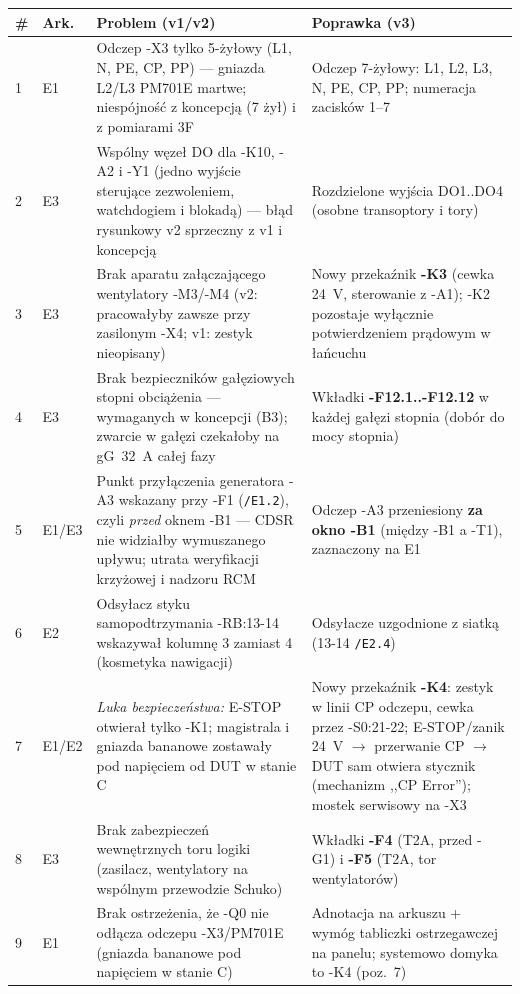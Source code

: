 \documentclass[11pt,a4paper]{article}
\begin{document}
\begin{longtable}{@{}p{}p{}p{}p{}@{}}
\toprule
\textbf{\#} & \textbf{Ark.} & \textbf{Problem (v1/v2)} & \textbf{Poprawka (v3)}\\
\midrule
\endhead
1 & E1 & Odczep -X3 tylko 5-żyłowy (L1, N, PE, CP, PP) --- gniazda L2/L3 PM701E martwe;
niespójność z koncepcją (7 żył) i z pomiarami 3F & Odczep 7-żyłowy: L1, L2, L3, N, PE, CP, PP;
numeracja zacisków 1--7\\
2 & E3 & Wspólny węzeł DO dla -K10, -A2 i -Y1 (jedno wyjście sterujące zezwoleniem, watchdogiem
i blokadą) --- błąd rysunkowy v2 sprzeczny z v1 i koncepcją & Rozdzielone wyjścia DO1..DO4
(osobne transoptory i tory)\\
3 & E3 & Brak aparatu załączającego wentylatory -M3/-M4 (v2: pracowałyby zawsze przy zasilonym
-X4; v1: zestyk nieopisany) & Nowy przekaźnik \textbf{-K3} (cewka 24~V, sterowanie z -A1);
-K2 pozostaje wyłącznie potwierdzeniem prądowym w łańcuchu\\
4 & E3 & Brak bezpieczników gałęziowych stopni obciążenia --- wymaganych w koncepcji (B3);
zwarcie w gałęzi czekałoby na gG~32~A całej fazy & Wkładki \textbf{-F12.1..-F12.12} w każdej
gałęzi stopnia (dobór do mocy stopnia)\\
5 & E1/E3 & Punkt przyłączenia generatora -A3 wskazany przy -F1 (\texttt{/E1.2}), czyli
\emph{przed} oknem -B1 --- CDSR nie widziałby wymuszanego upływu; utrata weryfikacji krzyżowej
i nadzoru RCM & Odczep -A3 przeniesiony \textbf{za okno -B1} (między -B1 a -T1), zaznaczony
na E1\\
6 & E2 & Odsyłacz styku samopodtrzymania -RB:13-14 wskazywał kolumnę 3 zamiast 4 (kosmetyka
nawigacji) & Odsyłacze uzgodnione z siatką (13-14 \texttt{/E2.4})\\
7 & E1/E2 & \emph{Luka bezpieczeństwa:} E-STOP otwierał tylko -K1; magistrala i gniazda bananowe
zostawały pod napięciem od DUT w stanie C & Nowy przekaźnik \textbf{-K4}: zestyk w linii CP
odczepu, cewka przez -S0:21-22; E-STOP/zanik 24~V $\to$ przerwanie CP $\to$ DUT sam otwiera
stycznik (mechanizm ,,CP Error''); mostek serwisowy na -X3\\
8 & E3 & Brak zabezpieczeń wewnętrznych toru logiki (zasilacz, wentylatory na wspólnym
przewodzie Schuko) & Wkładki \textbf{-F4} (T2A, przed -G1) i \textbf{-F5} (T2A, tor
wentylatorów)\\
9 & E1 & Brak ostrzeżenia, że -Q0 nie odłącza odczepu -X3/PM701E (gniazda bananowe pod napięciem
w stanie C) & Adnotacja na arkuszu + wymóg tabliczki ostrzegawczej na panelu; systemowo
domyka to -K4 (poz.~7)\\
\bottomrule
\end{longtable}
\end{document}
